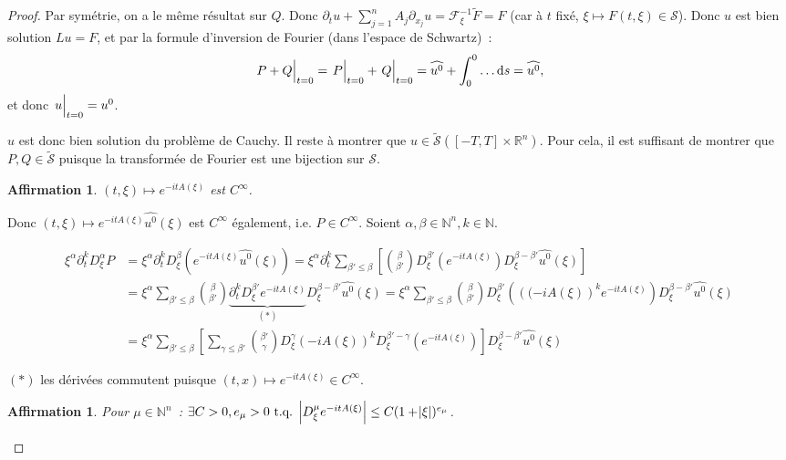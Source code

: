 \documentclass{report}
\newcommand{\R}{{\mathbb R}}
\newcommand{\N}{{\mathbb N}}
\newcommand{\tq}{\text{ t.q. }}
\newcommand{\st}{\tq}
\newcommand{\restr}[2]{\left.#1\vphantom{\big|}\right|_{#2}}
\newtheorem{claim}[thm]{Affirmation}
\theoremstyle{definition}
\theoremstyle{remark}
\begin{document}
\begin{proof}
Par symétrie, on a le même résultat sur $Q$. Donc $\partial_t u + \sum_{j=1}^nA_j\partial_{x_j}u = \mathcal F_\xi^{-1}\widetilde F = F$
(car à $t$ fixé, $\xi \mapsto F(t, \xi) \in \mathcal S$). Donc $u$ est bien solution $Lu = F$, et par la formule d'inversion de Fourier (dans l'espace de Schwartz)~:
\[\restr {P+Q}{t=0} = \restr P{t=0} + \restr Q{t=0} = \widehat {u^0} + \int_0^0\ldots\dif s = \widehat {u^0},\]
et donc $\restr u{t=0} = u^0$.

$u$ est donc bien solution du problème de Cauchy. Il reste à montrer que $u \in \widetilde {\mathcal S}([-T, T] \times \R^n)$. Pour cela, il est suffisant de montrer que
$P, Q \in \widetilde {\mathcal S}$ puisque la transformée de Fourier est une bijection sur $\mathcal S$.

\begin{claim}\label{claim 2} $(t, \xi) \mapsto e^{-itA(\xi)}$ est $C^\infty$.
\end{claim}

Donc $(t, \xi) \mapsto e^{-itA(\xi)}\widehat {u^0}(\xi)$ est $C^\infty$ également, i.e. $P \in C^\infty$.
Soient $\alpha, \beta \in \N^n, k \in \N$.

\begin{align*}
	\xi^\alpha\partial_t^kD_\xi^\alpha P
	&= \xi^\alpha\partial_t^kD_\xi^\beta\left(e^{-itA(\xi)}\widehat {u^0}(\xi)\right)
	= \xi^\alpha\partial_t^k\sum_{\beta'\leq\beta}\left[\binom \beta{\beta'}D_\xi^{\beta'}(e^{-itA(\xi)})D_\xi^{\beta-\beta'}\widehat {u^0}(\xi)\right] \\
	&= \xi^\alpha\sum_{\beta'\leq\beta}\binom\beta{\beta'}\underbrace {\partial_t^kD_\xi^{\beta'}e^{-itA(\xi)}}_{(*)}D_\xi^{\beta-\beta'}\widehat {u^0}(\xi)
	= \xi^\alpha\sum_{\beta'\leq\beta}\binom\beta{\beta'}D_\xi^{\beta'}\left(\left((-iA(\xi)\right)^ke^{-itA(\xi)}\right)D_\xi^{\beta-\beta'}\widehat {u^0}(\xi) \\
	&= \xi^\alpha\sum_{\beta'\leq\beta}\left[\sum_{\gamma\leq\beta'}\binom{\beta'}\gamma D_\xi^\gamma\left(-iA(\xi)\right)^kD_\xi^{\beta'-\gamma}\left(e^{-itA(\xi)}\right)\right]D_\xi^{\beta-\beta'}\widehat{u^0}(\xi)
\end{align*}

{\tiny {$(*)$ les dérivées commutent puisque $(t, x) \mapsto e^{-itA(\xi)} \in C^\infty$.}}

\begin{claim}\label{claim 3} Pour $\mu \in \N^n$~: $\exists C > 0, e_\mu > 0 \st \abs {D_\xi^\mu e^{-itA(\xi)}} \leq C(1+\abs\xi)^{e_\mu}$.
\end{claim}


\end{proof}
\end{document}
